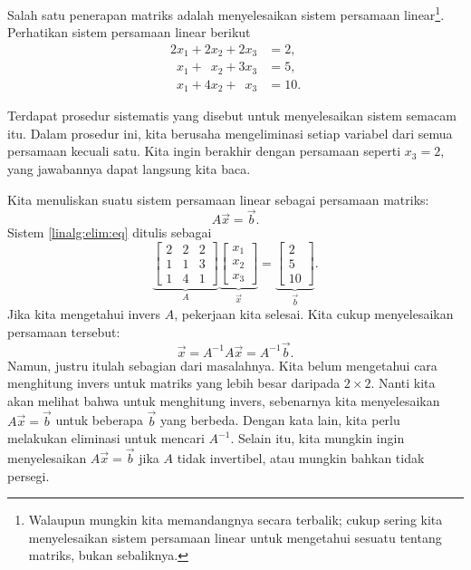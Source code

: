 Salah satu penerapan matriks adalah menyelesaikan sistem
persamaan linear\footnote{Walaupun mungkin kita memandangnya secara terbalik;
cukup sering kita menyelesaikan sistem persamaan linear
untuk mengetahui sesuatu tentang matriks, bukan sebaliknya.}.
Perhatikan sistem persamaan linear berikut
\begin{equation} \label{linalg:elim:eq}
\begin{aligned}
          2 x_1 +           2 x_2 +           2 x_3 & = 2 , \\
\phantom{9} x_1 + \phantom{9} x_2 +           3 x_3 & = 5 , \\
\phantom{9} x_1 +           4 x_2 + \phantom{9} x_3 & = 10 .
\end{aligned}
\end{equation}

Terdapat prosedur sistematis
yang disebut \emph{} untuk menyelesaikan sistem semacam itu.
Dalam prosedur ini,
kita berusaha mengeliminasi setiap variabel dari semua persamaan kecuali satu.
Kita ingin berakhir dengan persamaan
seperti $x_3 = 2$, yang jawabannya dapat langsung kita baca.

Kita menuliskan suatu sistem persamaan linear sebagai persamaan matriks:
\begin{equation*}
A \vec{x} = \vec{b} .
\end{equation*}
Sistem \eqref{linalg:elim:eq} ditulis sebagai
\begin{equation*}
\underbrace{
\begin{bmatrix}
2 & 2 & 2 \\
1 & 1 & 3 \\
1 & 4 & 1
\end{bmatrix}
}_{A}
\underbrace{
\begin{bmatrix}
x_1 \\
x_2 \\
x_3
\end{bmatrix}
}_{\vec{x}}
=
\underbrace{
\begin{bmatrix}
2 \\
5 \\
10
\end{bmatrix}
}_{\vec{b}} .
\end{equation*}
Jika kita mengetahui invers $A$, pekerjaan kita selesai.
Kita cukup menyelesaikan
persamaan tersebut:
\begin{equation*}
\vec{x} = A^{-1} A \vec{x} = A^{-1} \vec{b} .
\end{equation*}
Namun, justru itulah sebagian dari masalahnya.
Kita belum mengetahui cara menghitung
invers untuk matriks yang lebih besar daripada $2 \times 2$.
Nanti kita akan melihat bahwa untuk menghitung invers, sebenarnya kita menyelesaikan
$A \vec{x} = \vec{b}$ untuk beberapa $\vec{b}$ yang berbeda. Dengan kata lain,
kita perlu melakukan eliminasi untuk mencari $A^{-1}$.
Selain itu, kita mungkin ingin menyelesaikan $A \vec{x} = \vec{b}$
jika $A$ tidak invertibel, atau mungkin bahkan tidak persegi.

